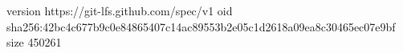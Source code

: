 version https://git-lfs.github.com/spec/v1
oid sha256:42bc4c677b9c0e84865407c14ac89553b2e05c1d2618a09ea8c30465ec07e9bf
size 450261
